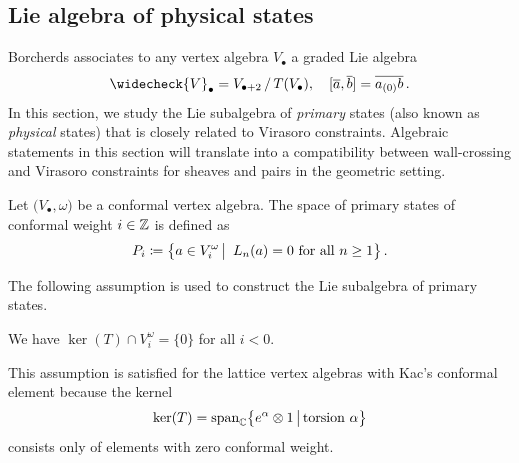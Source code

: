 \documentclass[a4paper, 12pt]{amsart}
\begin{document}
\subsection{Lie algebra of physical states}
\label{Sec: physical}

Borcherds \cite{Borcherds} associates to any vertex algebra $V_\bullet$ a graded Lie algebra
\begin{equation}\label{lie algebra}
\widecheck{V}_\bullet = V_{\bullet+2}\,/\,T(V_\bullet),\quad [\overline{a},\overline{b}]=\overline{a_{(0)}b}\,. 
\end{equation}
In this section, we study the Lie subalgebra of {\it primary} states (also known as {\it physical} states) that is closely related to Virasoro constraints. Algebraic statements in this section will translate into a compatibility between wall-crossing and Virasoro constraints for sheaves and pairs in the geometric setting. 

\begin{definition}
\label{Def: physicalstates}
Let $\big(V_\bullet,\omega\big)$ be a conformal vertex algebra. The space of primary states of conformal weight $i\in {\mathbb{Z}}$ is defined as 
$$P_i\coloneqq \big\{a\in V^\omega_i\,\big|\, \ L_n(a)=0\ \textnormal{for all}\ n\geq 1\big\}\,.
$$
\end{definition}

The following assumption is used to construct the Lie subalgebra of primary states.
\begin{assumption}\label{standard assumption}
We have $\ker(T)\cap V^\omega_i=\{0\}$ for all $i<0$.
\end{assumption}
This assumption is satisfied for the lattice vertex algebras with Kac's conformal element because the kernel
$$\ker(T)=\textnormal{span}_{{\mathbb{C}}}\big\{e^{\alpha}\otimes 1\,\big|\,\textnormal{torsion } \alpha\big\}
$$
consists only of elements with zero conformal weight.
\end{document}
